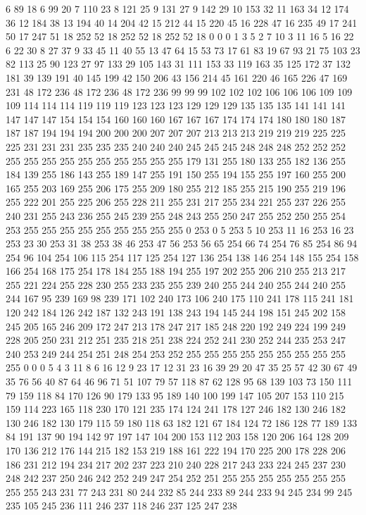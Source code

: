 6 89 18 6 99 20 7 110 23 8 121 25 9 131 27 9 142 29 10 153 32 11 163 34 12 174 36 12 184 38 13 194 40 14 204 42 15 212 44 15 220 45 16 228 47 16 235 49 17 241 50 17 247 51 18 252 52 18 252 52 18 252 52 18 0 0 0 1 3 5 2 7 10 3 11 16 5 16 22 6 22 30 8 27 37 9 33 45 11 40 55 13 47 64 15 53 73 17 61 83 19 67 93 21 75 103 23 82 113 25 90 123 27 97 133 29 105 143 31 111 153 33 119 163 35 125 172 37 132 181 39 139 191 40 145 199 42 150 206 43 156 214 45 161 220 46 165 226 47 169 231 48 172 236 48 172 236 48 172 236 99 99 99 102 102 102 106 106 106 109 109 109 114 114 114 119 119 119 123 123 123 129 129 129 135 135 135 141 141 141 147 147 147 154 154 154 160 160 160 167 167 167 174 174 174 180 180 180 187 187 187 194 194 194 200 200 200 207 207 207 213 213 213 219 219 219 225 225 225 231 231 231 235 235 235 240 240 240 245 245 245 248 248 248 252 252 252 255 255 255 255 255 255 255 255 255 
255 179 131 255 180 133 255 182 136 255 184 139 255 186 143 255 189 147 255 191 150 255 194 155 255 197 160 255 200 165 255 203 169 255 206 175 255 209 180 255 212 185 255 215 190 255 219 196 255 222 201 255 225 206 255 228 211 255 231 217 255 234 221 255 237 226 255 240 231 255 243 236 255 245 239 255 248 243 255 250 247 255 252 250 255 254 253 255 255 255 255 255 255 255 255 255 0 253 0 5 253 5 10 253 11 16 253 16 23 253 23 30 253 31 38 253 38 46 253 47 56 253 56 65 254 66 74 254 76 85 254 86 94 254 96 104 254 106 115 254 117 125 254 127 136 254 138 146 254 148 155 254 158 166 254 168 175 254 178 184 255 188 194 255 197 202 255 206 210 255 213 217 255 221 224 255 228 230 255 233 235 255 239 240 255 244 240 255 244 240 255 244 167 95 239 169 98 239 171 102 240 173 106 240 175 110 241 178 115 241 181 120 242 184 126 242 187 132 243 191 138 243 194 145 244 198 151 245 202 158 245 205 165 246 209 172 247 213 178 247 217 185 248 220 192 249 224 199 249 228 205 250 231 212 251 235 
218 251 238 224 252 241 230 252 244 235 253 247 240 253 249 244 254 251 248 254 253 252 255 255 255 255 255 255 255 255 255 255 0 0 0 5 4 3 11 8 6 16 12 9 23 17 12 31 23 16 39 29 20 47 35 25 57 42 30 67 49 35 76 56 40 87 64 46 96 71 51 107 79 57 118 87 62 128 95 68 139 103 73 150 111 79 159 118 84 170 126 90 179 133 95 189 140 100 199 147 105 207 153 110 215 159 114 223 165 118 230 170 121 235 174 124 241 178 127 246 182 130 246 182 130 246 182 130 179 115 59 180 118 63 182 121 67 184 124 72 186 128 77 189 133 84 191 137 90 194 142 97 197 147 104 200 153 112 203 158 120 206 164 128 209 170 136 212 176 144 215 182 153 219 188 161 222 194 170 225 200 178 228 206 186 231 212 194 234 217 202 237 223 210 240 228 217 243 233 224 245 237 230 248 242 237 250 246 242 252 249 247 254 252 251 255 255 255 255 255 255 255 255 255 243 231 77 243 231 80 244 232 85 244 233 89 244 233 94 245 234 99 245 235 105 245 236 111 246 237 118 246 237 125 247 238 
